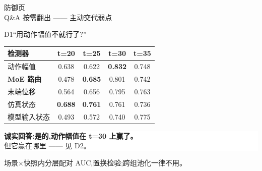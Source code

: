 \documentclass[aspectratio=169,10pt]{beamer}
\newcommand{\hi}[1]{{\color{teal}\bfseries #1}}
\newcommand{\bad}[1]{{\color{brick}\bfseries #1}}
\newcommand{\dimm}[1]{{\footnotesize\color{gray2}#1}}
\begin{document}
{
\begin{frame}[plain]
  \vfill\centering
  {\LARGE\color{gray2}防御页}\\[6pt]
  {\small\color{gray2}Q\&A 按需翻出 —— 主动交代弱点}
  \vfill
\end{frame}}

\begin{frame}{D1\quad “用动作幅值不就行了?”}
  \small\vfill
  \begin{center}
  \begin{tabular}{@{}lcccc@{}}
    \toprule
    \textbf{检测器} & \textbf{t=20} & \textbf{t=25} & \textbf{t=30} & \textbf{t=35} \\ \midrule
    动作幅值        & 0.638 & 0.622 & \bad{0.832} & 0.748 \\
    \textbf{MoE 路由} & 0.478 & \hi{0.685} & 0.801 & 0.742 \\
    末端位移        & 0.564 & 0.656 & 0.795 & 0.763 \\
    仿真状态        & \bad{0.688} & \bad{0.761} & 0.761 & 0.736 \\
    模型输入状态    & 0.493 & 0.572 & 0.740 & 0.775 \\ \bottomrule
  \end{tabular}
  \end{center}
  \vfill
  \begin{center}
  \colorbox{white}{\parbox{0.86\textwidth}{\centering\vspace{2pt}
    \bad{诚实回答:是的,动作幅值在 t=30 上赢了。}\\
    但它赢在哪里 —— 见 D2。\vspace{2pt}}}
  \end{center}
  \vfill
  \dimm{场景$\times$快照内分层配对 AUC,置换检验;跨组池化一律不用。}
\end{frame}
\end{document}
